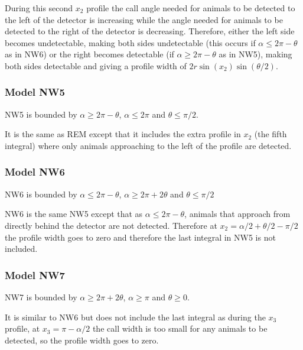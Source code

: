 During this second $x_2$ profile the call angle needed for animals to be detected to the left of the detector is increasing while the angle needed for animals to be detected to the right of the detector is decreasing. Therefore, either the left side becomes undetectable, making both sides undetectable (this occurs if $\alpha \le 2\pi - \theta$ as in NW6) or the right becomes detectable (if $\alpha \ge 2\pi - \theta$ as in NW5), making both sides detectable and giving a profile width of $2r\sin(x_2)\sin(\theta/2)$.


\subsubsection{Model NW5} \label{NW5}

NW5 is bounded by $\alpha \ge 2\pi - \theta$, $\alpha \le 2\pi$ and $\theta \le \pi/2$.

It is the same as REM except that it includes the extra profile in $x_2$ (the fifth integral) where only animals approaching to the left of the profile are detected.



\subsubsection{Model NW6} \label{NW6}

NW6 is bounded by $\alpha \le 2\pi - \theta$, $\alpha \ge 2\pi + 2\theta$ and $\theta \le \pi/2$

NW6 is the same NW5 except that as $\alpha \le 2\pi - \theta$, animals that approach from directly behind the detector are not detected. Therefore at $x_2 = \alpha/2 + \theta/2 - \pi/2$ the profile width goes to zero and therefore the last integral in NW5 is not included.





\subsubsection{Model NW7} \label{NW7}

NW7 is bounded by $\alpha \ge 2\pi + 2\theta$, $\alpha \ge \pi$ and $\theta \ge 0$.

It is similar to NW6 but does not include the last integral as during the $x_3$ profile, at $x_3 = \pi - \alpha/2$ the call width is too small for any animals to be detected, so the profile width goes to zero.

